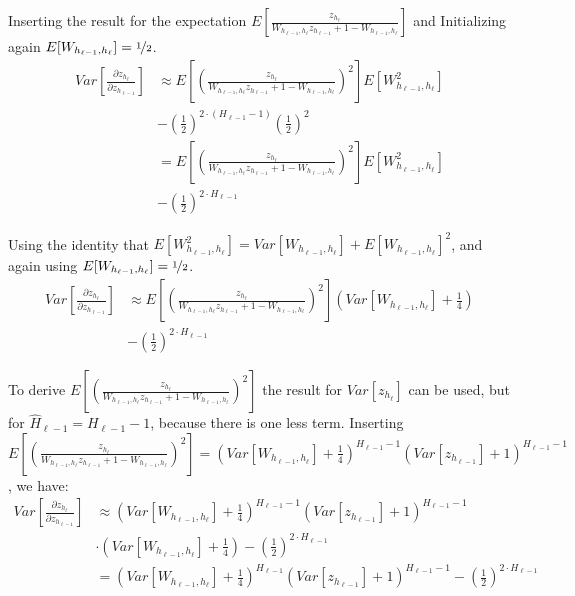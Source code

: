 Inserting the result for the expectation $E\left[\frac{z_{h_\ell}}{W_{h_{\ell-1},h_\ell} z_{h_{\ell-1}} + 1 - W_{h_{\ell-1},h_\ell}}\right]$ and Initializing again $E[W_{h_{\ell-1},h_\ell}] = \nicefrac{1}{2}$.
\begin{equation}
\begin{aligned}
Var\left[\frac{\partial z_{h_\ell}}{\partial z_{h_{\ell-1}}}\right] &\approx E\left[\left(\frac{z_{h_\ell}}{W_{h_{\ell-1},h_\ell} z_{h_{\ell-1}} + 1 - W_{h_{\ell-1},h_\ell}}\right)^2\right] E[W_{h_{\ell-1},h_\ell}^2] \\
&- \left(\frac{1}{2}\right)^{2 \cdot \left(H_{\ell-1}-1\right)} \left(\frac{1}{2}\right)^2 \\
&= E\left[\left(\frac{z_{h_\ell}}{W_{h_{\ell-1},h_\ell} z_{h_{\ell-1}} + 1 - W_{h_{\ell-1},h_\ell}}\right)^2\right] E[W_{h_{\ell-1},h_\ell}^2] \\
&- \left(\frac{1}{2}\right)^{2 \cdot H_{\ell-1}}
\end{aligned}
\end{equation}

Using the identity that $E[W_{h_{\ell-1},h_\ell}^2] = Var[W_{h_{\ell-1},h_\ell}] + E[W_{h_{\ell-1},h_\ell}]^2$, and again using $E[W_{h_{\ell-1},h_\ell}] = \nicefrac{1}{2}$.
\begin{equation}
\begin{aligned}
Var\left[\frac{\partial z_{h_\ell}}{\partial z_{h_{\ell-1}}}\right] &\approx E\left[\left(\frac{z_{h_\ell}}{W_{h_{\ell-1},h_\ell} z_{h_{\ell-1}} + 1 - W_{h_{\ell-1},h_\ell}}\right)^2\right] \left(Var[W_{h_{\ell-1},h_\ell}] + \frac{1}{4}\right) \\
&- \left(\frac{1}{2}\right)^{2 \cdot H_{\ell-1}}
\end{aligned}
\end{equation}

To derive $E\left[\left(\frac{z_{h_\ell}}{W_{h_{\ell-1},h_\ell} z_{h_{\ell-1}} + 1 - W_{h_{\ell-1},h_\ell}}\right)^2\right]$ the result for $Var[z_{h_\ell}]$ can be used, but for $\hat{H}_{\ell-1} = H_{\ell-1} - 1$, because there is one less term. Inserting $E\left[\left(\frac{z_{h_\ell}}{W_{h_{\ell-1},h_\ell} z_{h_{\ell-1}} + 1 - W_{h_{\ell-1},h_\ell}}\right)^2\right] = \left(Var[W_{h_{\ell-1},h_\ell}] + \frac{1}{4}\right)^{H_{\ell-1} - 1} \left(Var[z_{h_{\ell-1}}] + 1\right)^{H_{\ell-1} - 1}$, we have:
\begin{equation}
\begin{aligned}
Var\left[\frac{\partial z_{h_\ell}}{\partial z_{h_{\ell-1}}}\right] &\approx \left(Var[W_{h_{\ell-1},h_\ell}] + \frac{1}{4}\right)^{H_{\ell-1} - 1} \left(Var[z_{h_{\ell-1}}] + 1\right)^{H_{\ell-1} - 1} \\
&\cdot \left(Var[W_{h_{\ell-1},h_\ell}] + \frac{1}{4}\right) - \left(\frac{1}{2}\right)^{2 \cdot H_{\ell-1}} \\
&= \left(Var[W_{h_{\ell-1},h_\ell}] + \frac{1}{4}\right)^{H_{\ell-1}} \left(Var[z_{h_{\ell-1}}] + 1\right)^{H_{\ell-1} - 1} - \left(\frac{1}{2}\right)^{2 \cdot H_{\ell-1}}
\end{aligned}
\end{equation}

